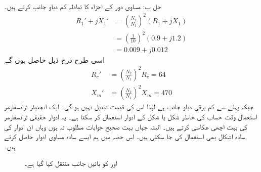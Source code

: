 حل ب:\quad
مساوی دور کے اجزاء کا تبادلہ کم دباو جانب کرتے ہیں۔
\begin{align*}
R_1'+j X_1' &=\left(\frac{N_2}{N_1} \right)^2 \left(R_1+j X_1 \right)\\
&=\left(\frac{1}{10} \right)^2 \left(0.9+j1.2 \right)\\
&=0.009+j0.012
\end{align*}
اسی طرح درج ذیل حاصل ہوں گے
\begin{align*}
R_c'&=\left(\frac{N_2}{N_1} \right)^2 R_c=64\\
X_m'&=\left(\frac{N_2}{N_1} \right)^2 X_m=470
\end{align*}
جبکہ  پہلے سے کم برقی دباو جانب ہے لہٰذا اس کی قیمت تبدیل نہیں ہو گی۔
%
ایک انجنیئر  ٹرانسفارمر استعمال وقت حساب کی خاطر شکل  یا شکل  کے ادوار استعمال کر سکتا ہے۔ یہ ادوار حقیقی ٹرانسفارمر کی بہت اچھی عکاسی کرتے ہیں۔ البتہ جہاں بہت صحیح جوابات مطلوب نہ ہوں وہاں ان ادوار کی سادہ اشکال بھی استعمال کی جا سکتی ہیں۔ اس حصہ میں ہم ایسے  سادہ مساوی ادوار حاصل کرتے ہیں۔
\begin{figure}
\centering
\caption{ اور  کو بائیں جانب منتقل کیا گیا ہے۔}
\label{شکل_ٹرانسفارمر_بائیں_جانب}
\end{figure}
